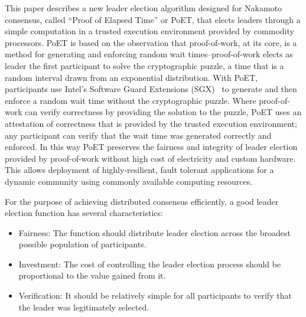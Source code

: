 This paper describes a new leader election algorithm designed for Nakamoto consensus, called ``Proof of Elapsed Time''
or PoET, that elects leaders through a simple computation in a trusted execution environment provided by commodity
processors.  PoET is based on the observation that proof-of-work, at its core, is a method for generating and enforcing
random wait times--proof-of-work elects as leader the first participant to solve the cryptographic puzzle, a time that
is a random interval drawn from an exponential distribution. With PoET, participants use Intel's Software Guard
Extensions (SGX)~\cite{} to generate and then enforce a random wait time without the cryptographic puzzle. Where
proof-of-work can verify correctness by providing the solution to the puzzle, PoET uses an attestation of correctness
that is provided by the trusted execution environment; any participant can verify that the wait time was generated
correctly and enforced.  In this way PoET preserves the fairness and integrity of leader election provided by
proof-of-work without high cost of electricity and custom hardware. This allows deployment of highly-resilient, fault
tolerant applications for a dynamic community using commonly available computing resources.



For the purpose of achieving distributed consensus efficiently, a good leader election function has several
characteristics:

\begin{itemize}
\item Fairness:
  The function should distribute leader election across the broadest possible population of participants.

\item Investment:
  The cost of controlling the leader election process should be proportional to the value gained from it. 

\item Verification:
  It should be relatively simple for all participants to verify that the leader was legitimately selected. 
\end{itemize}

